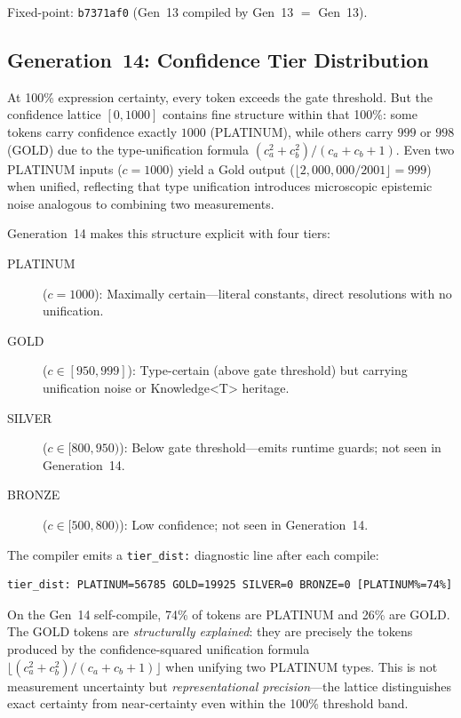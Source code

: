 \documentclass[acmsmall,screen,review,anonymous]{acmart}
\begin{document}
Fixed-point: \texttt{b7371af0} (Gen~13 compiled by Gen~13 $=$ Gen~13).

\subsection{Generation~14: Confidence Tier Distribution}
\label{sec:gen14}

At 100\% expression certainty, every token exceeds the gate threshold.
But the confidence lattice $[0, 1000]$ contains fine structure within that
100\%: some tokens carry confidence exactly $1000$ (PLATINUM), while others
carry $999$ or $998$ (GOLD) due to the type-unification formula
$(c_a^2 + c_b^2)/(c_a + c_b + 1)$.
Even two PLATINUM inputs ($c = 1000$) yield a Gold output
($\lfloor 2{,}000{,}000 / 2001 \rfloor = 999$) when unified, reflecting
that type unification introduces microscopic epistemic noise analogous to
combining two measurements.

Generation~14 makes this structure explicit with four tiers:
\begin{description}
  \item[PLATINUM] ($c = 1000$): Maximally certain---literal constants,
    direct resolutions with no unification.
  \item[GOLD] ($c \in [950, 999]$): Type-certain (above gate threshold)
    but carrying unification noise or Knowledge\textless T\textgreater{} heritage.
  \item[SILVER] ($c \in [800, 950)$): Below gate threshold---emits
    runtime guards; not seen in Generation~14.
  \item[BRONZE] ($c \in [500, 800)$): Low confidence; not seen in Generation~14.
\end{description}

The compiler emits a \texttt{tier\_dist:} diagnostic line after each compile:
\begin{verbatim}
tier_dist: PLATINUM=56785 GOLD=19925 SILVER=0 BRONZE=0 [PLATINUM%=74%]
\end{verbatim}
On the Gen~14 self-compile, 74\% of tokens are PLATINUM and 26\% are GOLD.
The GOLD tokens are \emph{structurally explained}: they are precisely the tokens
produced by the confidence-squared unification formula $\lfloor(c_a^2+c_b^2)/(c_a+c_b+1)\rfloor$
when unifying two PLATINUM types. This is not measurement uncertainty but
\emph{representational precision}---the lattice distinguishes exact certainty
from near-certainty even within the 100\% threshold band.
\end{document}
